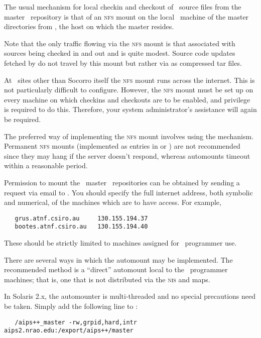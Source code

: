 The usual mechanism for local checkin and checkout of \aipspp\ source files
from the master \rcs\ repository is that of an \textsc{nfs} mount on the local
\aipspp\ machine of the master directories from , the
host on which the master resides.

Note that the only traffic flowing via the \textsc{nfs} mount is that
associated with sources being checked in and out and is quite modest.  Source
code updates fetched by  do not travel by this mount but rather
via  as compressed tar files.

At \aipspp\ sites other than Socorro itself the \textsc{nfs} mount runs
across the internet.  This is not particularly difficult to configure.
However, the \textsc{nfs} mount must be set up on every machine on which
checkins and checkouts are to be enabled, and  privilege is
required to do this.  Therefore, your system administrator's assistance will
again be required.

The preferred way of implementing the \textsc{nfs} mount involves using the
 mechanism.  Permanent \textsc{nfs} mounts (implemented as
entries in  or ) are not recommended since
they may hang if the server doesn't respond, whereas automounts timeout within
a reasonable period.

Permission to mount the \aipspp\ master \rcs\ repositories can be obtained by
sending a request via email to .  You should specify
the full internet address, both symbolic and numerical, of the machines which
are to have access.  For example,

\begin{verbatim}
   grus.atnf.csiro.au     130.155.194.37
   bootes.atnf.csiro.au   130.155.194.40
\end{verbatim}

\noindent
These should be strictly limited to machines assigned for \aipspp\ programmer
use.

There are several ways in which the automount may be implemented.  The
recommended method is a ``direct'' automount local to the \aipspp\ programmer
machines; that is, one that is not distributed via the \textsc{nis}
 and  maps.

In Solaris 2.x, the automounter is multi-threaded and no special precautions
need be taken.  Simply add the following line to :

\begin{verbatim}
   /aips++_master -rw,grpid,hard,intr aips2.nrao.edu:/export/aips++/master
\end{verbatim}

